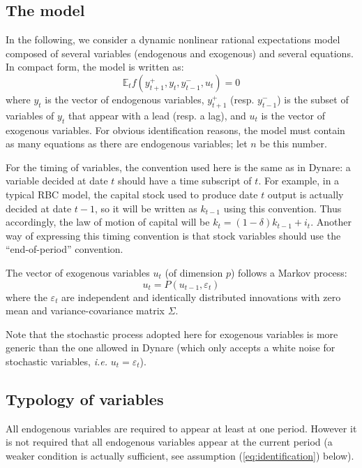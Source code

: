 \documentclass[11pt,a4paper]{article}
\begin{document}
\subsection{The model}

In the following, we consider a dynamic nonlinear rational expectations model
composed of several variables (endogenous and exogenous) and several
equations. In compact form, the model is written as:
\begin{equation}
  \label{eq:model}
  \mathbb{E}_t f(y^+_{t+1}, y_t, y^-_{t-1}, u_t) = 0
\end{equation}
where $y_t$ is the vector of endogenous variables, $y^+_{t+1}$
(resp. $y^-_{t-1}$) is the subset of variables of $y_t$ that appear with a lead
(resp. a lag), and $u_t$ is the vector of exogenous variables. For obvious
identification reasons, the model must contain as many equations as there are
endogenous variables; let $n$ be this number.

For the timing of variables, the convention used here is the same as in Dynare:
a variable decided at date $t$ should have a time subscript of $t$. For
example, in a typical RBC model, the capital stock used to produce date $t$
output is actually decided at date $t-1$, so it will be written as $k_{t-1}$
using this convention. Thus accordingly, the law of motion of capital will be
$k_t = (1-\delta)k_{t-1} + i_t$. Another way of expressing this timing
convention is that stock variables should use the ``end-of-period'' convention.

The vector of exogenous variables $u_t$ (of dimension $p$) follows a Markov
process:
\begin{equation*}
  u_t = P(u_{t-1}, \varepsilon_t)
\end{equation*}
where the $\varepsilon_t$ are independent and identically distributed
innovations with zero mean and variance-covariance matrix $\Sigma$.

Note that the stochastic process adopted here for exogenous variables is more
generic than the one allowed in Dynare (which only accepts a white noise for
stochastic variables, \textit{i.e.} $u_t = \varepsilon_t$).

\subsection{Typology of variables}

All endogenous variables are required to appear at least at one period. However
it is not required that all endogenous variables appear at the current period
(a weaker condition is actually sufficient, see assumption
(\ref{eq:identification}) below).
\end{document}
